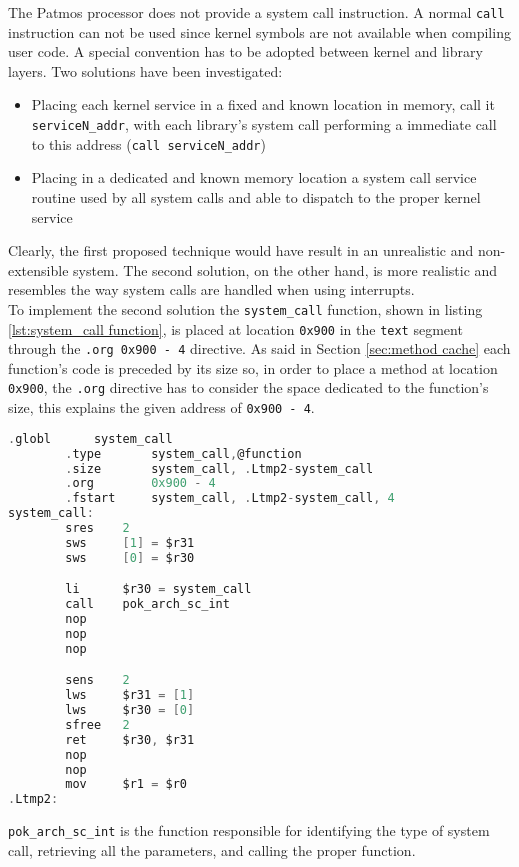 The Patmos processor does not provide a system call instruction. A normal \texttt{call} instruction can not be used since kernel symbols are not available when compiling user code. A special convention has to be adopted between kernel and library layers. Two solutions have been investigated:

\begin{itemize}
	\item Placing each kernel service in a fixed and known location in memory, call it \texttt{serviceN\_addr}, with each library's system call performing a immediate call to this address (\texttt{call serviceN\_addr})
	\item Placing in a dedicated and known memory location a system call service routine used by all system calls and able to dispatch to the proper kernel service
\end{itemize}

Clearly, the first proposed technique would have result in an unrealistic and non-extensible system. The second solution, on the other hand, is more realistic and resembles the way system calls are handled when using interrupts.\\

To implement the second solution the \texttt{system\_call} function, shown in listing \ref{lst:system_call function}, is placed at location \texttt{0x900} in the \texttt{text} segment through the \texttt{.org 0x900 - 4} directive. As said in Section \ref{sec:method cache} each function's code is preceded by its size so, in order to place a method at location \texttt{0x900}, the \texttt{.org} directive has to consider the space dedicated to the function's size, this explains the given address of \texttt{0x900 - 4}.

\begin{lstlisting}[language=C, caption=Kernel \texttt{system\_call} function, label=lst:system_call function]
		.globl		system_call
		.type 		system_call,@function
		.size 		system_call, .Ltmp2-system_call
		.org		0x900 - 4
		.fstart		system_call, .Ltmp2-system_call, 4
system_call:
		sres	2
		sws		[1] = $r31
		sws		[0] = $r30

		li		$r30 = system_call
		call 	pok_arch_sc_int
		nop
		nop
		nop

		sens	2
		lws		$r31 = [1]
		lws		$r30 = [0]
		sfree	2
		ret		$r30, $r31
		nop
		nop
		mov		$r1 = $r0
.Ltmp2:
\end{lstlisting}

\texttt{pok\_arch\_sc\_int} is the function responsible for identifying the type of system call, retrieving all the parameters, and calling the proper function. \\

